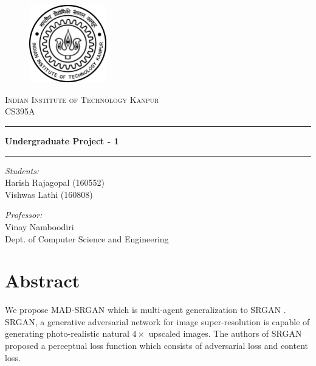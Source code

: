 \documentclass[12pt,a4paper,twocolumn]{article}
\begin{document}
    \begin{titlepage}
        \centering

        \vspace*{2cm}
        \begin{figure}[h]
            \centering
            \includegraphics[width=0.3\textwidth]{iitk-logo.png}\\[15mm]
        \end{figure}
        \textsc{\LARGE Indian Institute of Technology Kanpur}\\[1cm]
        {\Large CS395A}\\[7mm]

        \hrule
        \vspace{3mm}
        \textbf{\Large Undergraduate Project - 1}\\[5mm]
        \hrule
        \vspace{3mm}

        \begin{multicols}{2}
            \textit{Students:}\\[2mm]
            Harish Rajagopal (160552)\\
            Vishwas Lathi (160808)\\

            \vfill\null\columnbreak

            \textit{Professor:}\\[2mm]
            Vinay Namboodiri\\
            Dept. of Computer Science and Engineering
        \end{multicols}
    \end{titlepage}


    \section{Abstract}
        We propose MAD-SRGAN which is multi-agent generalization to SRGAN \cite{SRGAN}.
        SRGAN, a generative adversarial network for image super-resolution is capable of generating photo-realistic natural $4\times$ upscaled images.
        The authors of SRGAN proposed a perceptual loss function which consists of adversarial loss and content loss.
\end{document}
